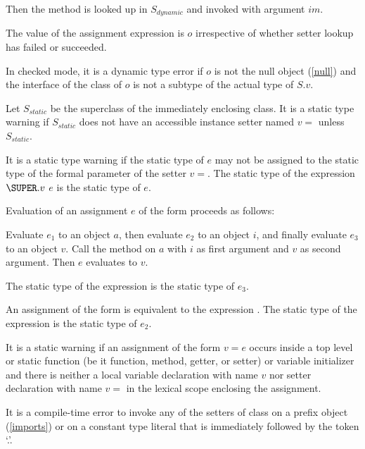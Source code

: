 \documentclass{article}
\begin{document}
\LMHash{}
Then the method  is looked up in $S_{dynamic}$ and invoked with argument $im$.

\LMHash{}
The value of the assignment expression is $o$ irrespective of whether setter lookup has failed or succeeded.

\LMHash{}
In checked mode, it is a dynamic type error if $o$ is not the null object (\ref{null}) and the interface of the class of $o$ is not a subtype of the actual type of $S.v$.

\LMHash{}
Let $S_{static}$ be the superclass of the immediately enclosing class.
It is a static type warning if $S_{static}$ does not have an accessible instance setter named $v=$ unless $S_{static}$.

\LMHash{}
It is a static type warning if the static type of $e$ may not be assigned to the static type of the formal parameter of the setter $v=$.
The static type of the expression $\SUPER.v$ \code{=} $e$ is the static type of $e$.

\LMHash{}
Evaluation of an assignment $e$ of the form 
proceeds as follows:

\LMHash{}
Evaluate $e_1$ to an object $a$, then evaluate $e_2$ to an object $i$, and finally evaluate $e_3$ to an object $v$.
Call the method \code{[]=} on $a$ with $i$ as first argument and $v$ as second argument.
Then $e$ evaluates to $v$.

\LMHash{}
The static type of the expression  is the static type of $e_3$.

\LMHash{}
An assignment of the form  is equivalent to the expression .
The static type of the expression  is the static type of $e_2$.


\LMHash{}
It is a static warning if an assignment of the form $v = e$ occurs inside a top level or static function (be it function, method, getter, or setter) or variable initializer and there is neither a local variable declaration with name $v$ nor setter declaration with name $v=$ in the lexical scope enclosing the assignment.

\LMHash{}
It is a compile-time error to invoke any of the setters of class  on a prefix object (\ref{imports}) or on a constant type literal that is immediately followed by the token `.'.
\end{document}

